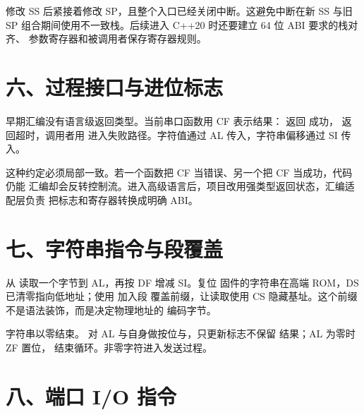 \begin{center}
\end{center}

修改 SS 后紧接着修改 SP，且整个入口已经关闭中断。这避免中断在新 SS 与旧 SP
组合期间使用不一致栈。后续进入 C++20 时还要建立 64 位 ABI 要求的栈对齐、
参数寄存器和被调用者保存寄存器规则。

\section{六、过程接口与进位标志}

早期汇编没有语言级返回类型。当前串口函数用 CF 表示结果： 返回
成功， 返回超时，调用者用  进入失败路径。字符值通过 AL
传入，字符串偏移通过 SI 传入。

这种约定必须局部一致。若一个函数把 CF 当错误、另一个把 CF 当成功，代码仍能
汇编却会反转控制流。进入高级语言后，项目改用强类型返回状态，汇编适配层负责
把标志和寄存器转换成明确 ABI。

\section{七、字符串指令与段覆盖}

 从  读取一个字节到 AL，再按 DF 增减 SI。复位
固件的字符串在高端 ROM，DS 已清零指向低地址；使用  加入段
覆盖前缀，让读取使用 CS 隐藏基址。这个前缀不是语法装饰，而是决定物理地址的
编码字节。

字符串以零结束。 对 AL 与自身做按位与，只更新标志不保留
结果；AL 为零时 ZF 置位， 结束循环。非零字符进入发送过程。

\section{八、端口 I/O 指令}

